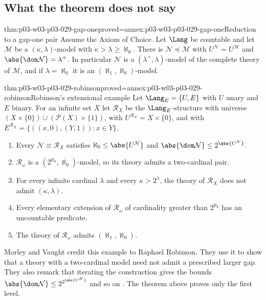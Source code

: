 \subsection{What the theorem does not say}

\begin{hblemma}{thm:p03-w03-p03-029-gap-one}{proved=annex:p03-w03-p03-029-gap-one}{Reduction to a gap-one pair}
Assume the Axiom of Choice. Let \(\Lang\) be countable and let
\(\mathcal M\) be a \((\kappa,\lambda)\)-model with
\(\kappa>\lambda\geq\aleph_0\). There is \(\mathcal N\preccurlyeq\mathcal
M\) with \(U^{\mathcal N}=U^{\mathcal M}\) and
\(\abs{\dom\mathcal N}=\lambda^+\). In particular \(\mathcal N\) is a
\((\lambda^+,\lambda)\)-model of the complete theory of \(\mathcal M\), and if
\(\lambda=\aleph_0\) it is an \((\aleph_1,\aleph_0)\)-model.
\end{hblemma}

\begin{hbtheorem}{thm:p03-w03-p03-029-robinson}{proved=annex:p03-w03-p03-029-robinson}{Robinson's extensional example}
Let \(\Lang_E=\{U,E\}\) with \(U\) unary and \(E\) binary. For an infinite set
\(X\) let \(\mathcal R_X\) be the \(\Lang_E\)-structure with universe
\((X\times\{0\})\cup(\mathcal P(X)\times\{1\})\), with
\(U^{\mathcal R_X}=X\times\{0\}\), and with
\(E^{\mathcal R_X}=\{((x,0),(Y,1)):x\in Y\}\).
\begin{enumerate}
  \item Every \(\mathcal N\equiv\mathcal R_X\) satisfies
        \(\aleph_0\leq\abs{U^{\mathcal N}}\) and
        \(\abs{\dom\mathcal N}\leq2^{\abs{U^{\mathcal N}}}\).
  \item \(\mathcal R_\omega\) is a \((2^{\aleph_0},\aleph_0)\)-model, so
        its theory admits a two-cardinal pair.
  \item For every infinite cardinal \(\lambda\) and every
        \(\kappa>2^\lambda\), the theory of \(\mathcal R_X\) does not admit
        \((\kappa,\lambda)\).
  \item Every elementary extension of \(\mathcal R_\omega\) of cardinality
        greater than \(2^{\aleph_0}\) has an uncountable predicate.
  \item The theory of \(\mathcal R_\omega\) admits
        \((\aleph_1,\aleph_0)\).
\end{enumerate}
\end{hbtheorem}

Morley and Vaught credit this example to Raphael Robinson. They use it to
show that a theory with a two-cardinal model need not admit a prescribed
larger gap. They also remark that iterating the construction gives the
bounds \(\abs{\dom\mathcal N}\leq2^{2^{\abs{U^{\mathcal N}}}}\) and so on
\cite[p.~55]{MorleyVaught1962}. The theorem above proves only the first
level.

